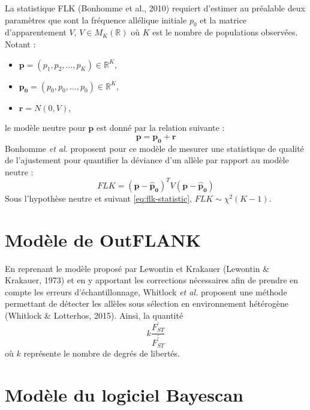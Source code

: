 \documentclass[12pt,a4paper,twoside]{ugathesis}
\theoremstyle{definition}
\theoremstyle{definition}
\theoremstyle{remark}
\begin{document}
La statistique FLK (Bonhomme et al., 2010) requiert d'estimer au
préalable deux paramètres que sont la fréquence allélique initiale
\(p_0\) et la matrice d'apparentement \(V\), \(V \in M_K(\mathbb{R})\)
où \(K\) est le nombre de populations observées. Notant :
\begin{itemize}
\item
  \(\boldsymbol{p} = (p_1, p_2, \dots, p_K) \in \mathbb{R}^K\),
\item
  \(\boldsymbol{p_0} = (p_0, p_0, \dots, p_0) \in \mathbb{R}^K\),
\item
  \(\boldsymbol{r} = N(0, V)\),
\end{itemize}
le modèle neutre pour \(\boldsymbol{p}\) est donné par la relation
suivante :
\begin{equation} 
  \boldsymbol{p} = \boldsymbol{p_0} + \boldsymbol{r} 
  \label{eq:flk-neutral-model}
\end{equation}
Bonhomme \textit{et al.} proposent pour ce modèle de mesurer une
statistique de qualité de l'ajustement pour quantifier la déviance d'un
allèle par rapport au modèle neutre :
\begin{equation} 
  FLK = (\boldsymbol{p - \hat{p}_0})^T V (\boldsymbol{p - \hat{p}_0})                               
  \label{eq:flk-statistic}
\end{equation}
Sous l'hypothèse neutre et suivant \eqref{eq:flk-statistic},
\(FLK \sim \chi^2 (K - 1)\).

\section{Modèle de OutFLANK}\label{modele-de-outflank}

En reprenant le modèle proposé par Lewontin et Krakauer (Lewontin \&
Krakauer, 1973) et en y apportant les corrections nécessaires afin de
prendre en compte les erreurs d'échantillonnage, Whitlock
\textit{et al.} proposent une méthode permettant de détecter les allèles
sous sélection en environnement hétérogène (Whitlock \& Lotterhos,
2015). Ainsi, la quantité
\begin{equation} 
  k \frac{F_{ST}^{\prime}}{\bar{{F_{ST}^{\prime}}}}  
  \label{eq:OutFLANK-statistic}
\end{equation}
où \(k\) représente le nombre de degrés de libertés.

\section{Modèle du logiciel Bayescan}\label{modele-du-logiciel-bayescan}
\end{document}
